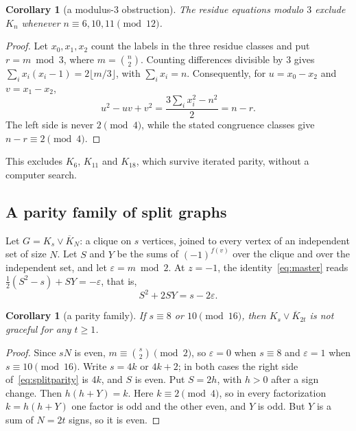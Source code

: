 \documentclass[11pt]{amsart}
\newcommand{\thmmarker}{}
\newcommand{\mgpt}{\gdef\thmmarker{\textsuperscript{$\dagger$}}}
\theoremstyle{tplain}
\newtheorem{corollary}[theorem]{Corollary}
\theoremstyle{tdefinition}
\theoremstyle{tremark}
\begin{document}
\mgpt\begin{corollary}[a modulus-$3$ obstruction]\label{cor:modthree}
The residue equations modulo $3$ exclude $K_n$ whenever
$n\equiv6,10,11\pmod{12}$.
\end{corollary}

\begin{proof}
Let $x_0,x_1,x_2$ count the labels in the three residue classes and put
$r=m\bmod3$, where $m=\binom n2$. Counting differences divisible by $3$ gives
$\sum_i x_i(x_i-1)=2\lfloor m/3\rfloor$, with $\sum_i x_i=n$.
Consequently, for $u=x_0-x_2$ and $v=x_1-x_2$,
\[
 u^2-uv+v^2=\frac{3\sum_i x_i^2-n^2}{2}=n-r.
\]
The left side is never $2\pmod4$, while the stated congruence classes give
$n-r\equiv2\pmod4$.
\end{proof}

This excludes $K_6$, $K_{11}$ and $K_{18}$, which survive iterated parity,
without a computer search.

\subsection{A parity family of split graphs}

Let $G=K_s\vee\overline K_N$: a clique on $s$ vertices, joined to every vertex of
an independent set of size $N$. Let $S$ and $Y$ be the sums of $(-1)^{f(v)}$
over the clique and over the independent set, and let $\varepsilon=m\bmod2$.
At $z=-1$, the identity~\eqref{eq:master} reads
$\frac12(S^2-s)+SY=-\varepsilon$, that is,
\begin{equation}\label{eq:splitparity}
  S^2+2SY=s-2\varepsilon .
\end{equation}

\mgpt\begin{corollary}[a parity family]\label{cor:splitparity}
If $s\equiv8$ or $10\pmod{16}$, then $K_s\vee\overline K_{2t}$ is not graceful
for any $t\ge1$.
\end{corollary}

\begin{proof}
Since $sN$ is even, $m\equiv\binom s2\pmod2$, so $\varepsilon=0$ when
$s\equiv8$ and $\varepsilon=1$ when $s\equiv10\pmod{16}$. Write $s=4k$ or
$4k+2$; in both cases the right side
of~\eqref{eq:splitparity} is $4k$, and $S$ is even. Put $S=2h$, with $h>0$
after a sign change. Then $h(h+Y)=k$. Here $k\equiv2\pmod4$, so in every
factorization $k=h(h+Y)$ one factor is odd and the other even, and $Y$ is odd.
But $Y$ is a sum of $N=2t$ signs, so it is even.
\end{proof}
\end{document}
